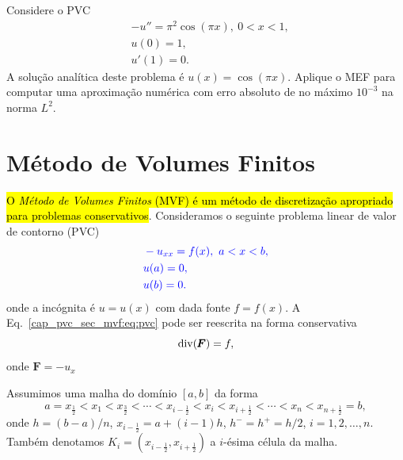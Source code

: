 \begin{exer}
  Considere o PVC
  \begin{align}
    &-u'' = \pi^2\cos(\pi x), ~0 < x < 1,\\
    &u(0) = 1,\\
    &u'(1) = 0.
  \end{align}
  A solução analítica deste problema é $u(x) = \cos(\pi x)$. Aplique o MEF para computar uma aproximação numérica com erro absoluto de no máximo $10^{-3}$ na norma $L^2$.
\end{exer}

\section{Método de Volumes Finitos}\label{cap_pvc_sec_mvf}

\hl{O \emph{Método de Volumes Finitos} (MVF) é um método de discretização apropriado para problemas conservativos}. Consideramos o seguinte problema linear de valor de contorno (PVC)
\begin{subequations}\label{cap_pvc_sec_mvf:eq:pvc}\hleq
  \begin{align}
    &-u_{xx} = f(x), ~a < x < b, \label{cap_pvc_sec_mvf:eq:pvc_eq}\\
    &u(a) = 0, \label{cap_pvc_sec_mvf:eq:pvc_bc1}\\
    &u(b) = 0. \label{cap_pvc_sec_mvf:eq:pvc_bc2}
  \end{align}
\end{subequations}
onde a incógnita é $u = u(x)$ com dada fonte $f = f(x)$. A Eq.~\eqref{cap_pvc_sec_mvf:eq:pvc} pode ser reescrita na forma conservativa
\begin{equation}
  \operatorname{div}(\pmb{F}) = f,
\end{equation}
onde $\pmb{F} = -u_x$

\begin{flushleft}
\end{flushleft}

Assumimos uma malha do domínio $[a, b]$ da forma
\begin{equation}
  a = x_{\frac{1}{2}} < x_1 < x_{\frac{3}{2}} < \cdots < x_{i-\frac{1}{2}} < x_i < x_{i+\frac{1}{2}} < \cdots < x_{n} < x_{n+\frac{1}{2}} = b,
\end{equation}
onde $h = (b-a)/n$, $x_{i-\frac{1}{2}} = a + (i-1)h$, $h^{-} = h^{+} = h/2$, $i = 1, 2, \dotsc, n$. Também denotamos $K_i = \left(x_{i-\frac{1}{2}}, x_{i+\frac{1}{2}}\right)$ a $i$-ésima célula da malha.

